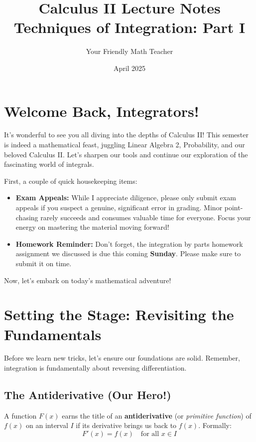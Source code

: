 \documentclass[11pt]{article}
\begin{document}
\title{Calculus II Lecture Notes \\ \Large Techniques of Integration: Part I}
\author{Your Friendly Math Teacher} %
\date{April 2025} %
\maketitle

\section*{Welcome Back, Integrators!}

It's wonderful to see you all diving into the depths of Calculus II! This semester is indeed a mathematical feast, juggling Linear Algebra 2, Probability, and our beloved Calculus II. Let's sharpen our tools and continue our exploration of the fascinating world of integrals.

First, a couple of quick housekeeping items:

\begin{itemize}
    \item \textbf{Exam Appeals:} While I appreciate diligence, please only submit exam appeals if you suspect a genuine, significant error in grading. Minor point-chasing rarely succeeds and consumes valuable time for everyone. Focus your energy on mastering the material moving forward!
    \item \textbf{Homework Reminder:} Don't forget, the integration by parts homework assignment we discussed is due this coming \textbf{Sunday}. Please make sure to submit it on time.
\end{itemize}

Now, let's embark on today's mathematical adventure!

\section{Setting the Stage: Revisiting the Fundamentals}

Before we learn new tricks, let's ensure our foundations are solid. Remember, integration is fundamentally about reversing differentiation.

\subsection{The Antiderivative (Our Hero!)}
A function $F(x)$ earns the title of an \textbf{antiderivative} (or \textit{primitive function}) of $f(x)$ on an interval $I$ if its derivative brings us back to $f(x)$. Formally:
\[ F'(x) = f(x) \quad \text{for all } x \in I \]
\end{document}
